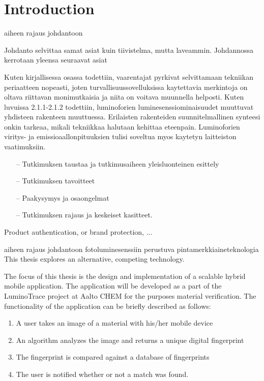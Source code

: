 \documentclass[thesis.tex]{subfiles}
\begin{document}
\chapter{Introduction}
\label{chapter:intro}

aiheen rajaus johdantoon

Johdanto selvittaa samat asiat kuin tiivistelma, mutta laveammin. Johdannossa kerrotaan yleensa seuraavat asiat

Kuten kirjallisessa osassa todettiin, vaarentajat pyrkivat selvittamaan tekniikan periaatteen nopeasti, joten turvallisuussovelluksissa kaytettavia merkintoja on oltava riittavan monimutkaisia ja niita on voitava muunnella helposti. Kuten luvuissa 2.1.1-2.1.2 todettiin, luminoforien luminesenssiominaisuudet muuttuvat yhdisteen rakenteen muuttuessa. Erilaisten rakenteiden suunnitelmallinen synteesi onkin tarkeaa, mikali tekniikkaa halutaan kehittaa eteenpain. Luminoforien viritys- ja emissioaallonpituuksien tulisi soveltua myos kaytetyn laitteiston vaatimuksiin.

\begin{itemize}
\item[--]Tutkimuksen taustaa ja tutkimusaiheen yleisluonteinen esittely
\item[--]Tutkimuksen tavoitteet
\item[--]Paakysymys ja osaongelmat
\item[--]Tutkimuksen rajaus ja keskeiset kasitteet.
\end{itemize}

Product authentication, or brand protection, ...

aiheen rajaus johdantoon
fotoluminesenssiin perustuva pintamerkkiaineteknologia
This thesis explores an alternative, competing technology.

The focus of this thesis is the design and implementation of a scalable hybrid mobile application. The application will be developed as a part of the LuminoTrace project at Aalto CHEM for the purposes material verification. The functionality of the application can be briefly described as follows:

\begin{enumerate}
\item A user takes an image of a material with his/her mobile device
\item An algorithm analyzes the image and returns a unique digital fingerprint
\item The fingerprint is compared against a database of fingerprints
\item The user is notified whether or not a match was found.
\end{enumerate}
\end{document}
